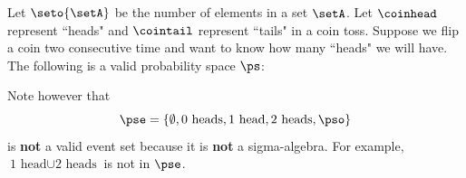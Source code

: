 \begin{example}
Let $\seto{\setA}$ be the number of elements in a set $\setA$.
Let $\coinhead$ represent ``heads" and $\cointail$ represent ``tails"
in a coin toss.
Suppose we flip a coin two consecutive time and want to
know how many ``heads" we will have.
The following is a valid probability space $\ps$:

Note however that
\[   \pse = \left\{ \emptyset, \mbox{0 heads}, \mbox{1 head}, \mbox{2 heads}, \pso \right\} \]
is {\bf not} a valid event set because it is {\bf not} a sigma-algebra.
For example, $\mbox{1 head}\cup\mbox{2 heads}$ is not in $\pse$.
\end{example}


